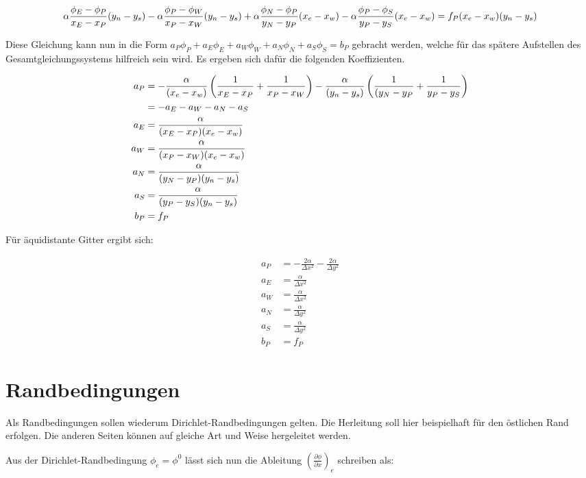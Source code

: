 \documentclass[10pt, ngerman,colorback,accentcolor=tud2d]{tudreport}
\begin{document}
\begin{equation*}
  \alpha \frac{\phi_E-\phi_P}{x_E-x_P} (y_n-y_s) -
  \alpha \frac{\phi_P-\phi_W}{x_P-x_W} (y_n-y_s) +
  \alpha \frac{\phi_N-\phi_P}{y_N-y_P} (x_e-x_w) -
  \alpha \frac{\phi_P-\phi_S}{y_P-y_S} (x_e-x_w) =
  f_P (x_e-x_w) (y_n-y_s)
\end{equation*}

Diese Gleichung kann nun in die Form
$a_P\phi_P +a_E\phi_E +a_W\phi_W +a_N\phi_N +a_S\phi_S =b_P$
gebracht werden, welche für das spätere Aufstellen des Gesamtgleichungssystems
hilfreich sein wird. Es ergeben sich dafür die folgenden Koeffizienten.

\begin{align*}
  a_P &= -\frac{\alpha}{(x_e-x_w)} \left({\frac{1}{x_E-x_P} + \frac{1}{x_P-x_W}}\right)
  -\frac{\alpha}{(y_n-y_s)} \left({\frac{1}{(y_N-y_P} + \frac{1}{y_P-y_S}}\right)\\
  &= -a_E-a_W-a_N-a_S\\
  a_E &= \frac{\alpha}{(x_E-x_P)(x_e-x_w)} \\
  a_W &= \frac{\alpha}{(x_P-x_W)(x_e-x_w)} \\
  a_N &= \frac{\alpha}{(y_N-y_P)(y_n-y_s)} \\
  a_S &= \frac{\alpha}{(y_P-y_S)(y_n-y_s)} \\
  b_P &=f_P
\end{align*}

Für äquidistante Gitter ergibt sich:

\begin{align*}
  a_P &= -\frac{2 \alpha}{\Delta x^2} -\frac{2 \alpha}{\Delta y^2}\\
  a_E &= \frac{\alpha}{\Delta x^2} \\
  a_W &= \frac{\alpha}{\Delta x^2} \\
  a_N &= \frac{\alpha}{\Delta y^2} \\
  a_S &= \frac{\alpha}{\Delta y^2} \\
  b_P &=f_P
\end{align*}

\section{Randbedingungen}
\label{sec:Randbedingungen}

Als Randbedingungen sollen wiederum Dirichlet-Randbedingungen gelten. Die Herleitung
soll hier beispielhaft für den östlichen Rand erfolgen.
Die anderen Seiten können auf gleiche Art und Weise hergeleitet werden.

Aus der Dirichlet-Randbedingung $\phi_e = \phi^0$ lässt sich nun die Ableitung
$\left({\frac{\partial \phi}{\partial x}}\right)_e$ schreiben als:
\end{document}
